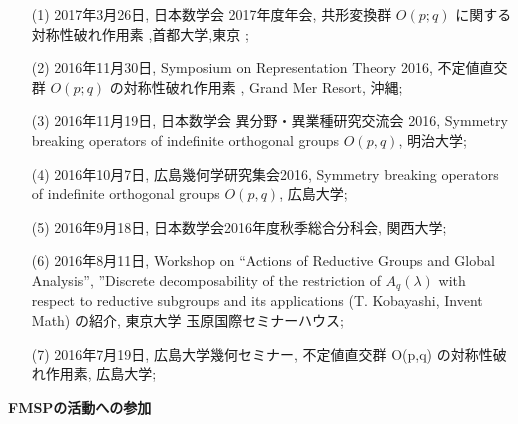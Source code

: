 \documentclass[a4j,twocolumn]{jarticle}
\begin{document}
\vspace{0.1cm}
\begin{enumerate}
	\item[(1)] 
2017年3月26日, 日本数学会 2017年度年会, 共形変換群 $O( p;q )$ に関する対称性破れ作用素 ,首都大学,東京 ;
	\item[(2)] 
2016年11月30日, Symposium on Representation Theory 2016, 不定値直交群 $O ( p; q )$ の対称性破れ作用素 , Grand Mer Resort, 沖縄;
	\item[(3)] 
2016年11月19日, 日本数学会 異分野・異業種研究交流会 2016, Symmetry breaking operators of indefinite orthogonal groups $O(p,q)$, 明治大学;
	\item[(4)] 
2016年10月7日, 広島幾何学研究集会2016, Symmetry breaking operators of indefinite orthogonal groups $O(p,q)$, 広島大学;
	\item[(5)] 
2016年9月18日, 日本数学会2016年度秋季総合分科会, 関西大学;
	\item[(6)] 
2016年8月11日, Workshop on “Actions of Reductive Groups and Global Analysis”, ”Discrete decomposability of the restriction of $A_q(\lambda)$ with respect to reductive subgroups and its applications (T. Kobayashi, Invent Math) の紹介, 東京大学 玉原国際セミナーハウス;
	\item[(7)] 
2016年7月19日, 広島大学幾何セミナー, 不定値直交群 O(p,q) の対称性破れ作用素, 広島大学;
\end{enumerate}

\vspace{0.2cm}
\noindent
{\bf FMSPの活動への参加}

\vspace{0.1cm}
\end{document}
